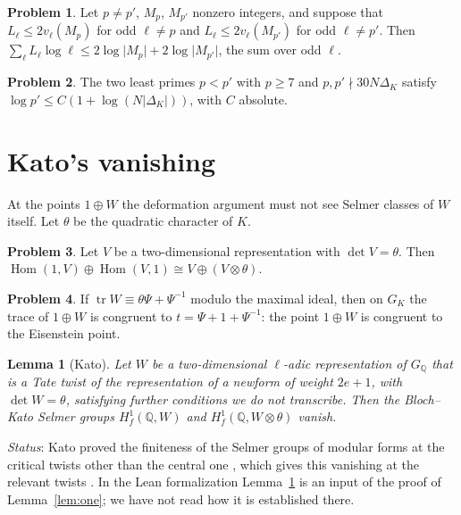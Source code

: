 \documentclass[reqno]{amsart}
\theoremstyle{definition}
\newtheorem{problem}{Problem}[section]
\theoremstyle{plain}
\newtheorem{lemma}[theorem]{Lemma}
\theoremstyle{remark}
\newcommand{\Q}{\mathbb{Q}}
\newcommand{\Hom}{\operatorname{Hom}}
\newcommand{\tr}{\operatorname{tr}}
\begin{document}
\begin{problem}\label{pr:two-primes}
Let \(p\ne p'\), \(M_p\), \(M_{p'}\) nonzero integers, and suppose that \(L_\ell\le2v_\ell(M_p)\) for odd \(\ell\ne p\) and \(L_\ell\le2v_\ell(M_{p'})\) for odd \(\ell\ne p'\).  Then \(\sum_\ell L_\ell\log\ell\le2\log\lvert M_p\rvert+2\log\lvert M_{p'}\rvert\), the sum over odd \(\ell\).
\end{problem}

\begin{problem}\label{pr:least-primes}
The two least primes \(p<p'\) with \(p\ge7\) and \(p,p'\nmid30N\Delta_K\) satisfy \(\log p'\le C(1+\log(N\lvert\Delta_K\rvert))\), with \(C\) absolute.
\end{problem}

\section{Kato's vanishing}\label{sec:kato}

At the points \(1\oplus W\) the deformation argument must not see Selmer classes of \(W\) itself.  Let \(\theta\) be the quadratic character of \(K\).

\begin{problem}\label{pr:hom-part}
Let \(V\) be a two-dimensional representation with \(\det V=\theta\).  Then \(\Hom(1,V)\oplus\Hom(V,1)\cong V\oplus(V\otimes\theta)\).
\end{problem}

\begin{problem}\label{pr:residual}
If \(\tr W\equiv\theta\Psi+\Psi^{-1}\) modulo the maximal ideal, then on \(G_K\) the trace of \(1\oplus W\) is congruent to \(t=\Psi+1+\Psi^{-1}\): the point \(1\oplus W\) is congruent to the Eisenstein point.
\end{problem}

\begin{lemma}[Kato]\label{lem:kato}
Let \(W\) be a two-dimensional \(\ell\)-adic representation of \(G_\Q\) that is a Tate twist of the representation of a newform of weight \(2e+1\), with \(\det W=\theta\), satisfying further conditions we do not transcribe.  Then the Bloch--Kato Selmer groups \(H^1_f(\Q,W)\) and \(H^1_f(\Q,W\otimes\theta)\) vanish.
\end{lemma}

\noindent\emph{Status}: Kato proved the finiteness of the Selmer groups of modular forms at the critical twists other than the central one \cite[Thm.~14.2]{Ka}, which gives this vanishing at the relevant twists \cite[\S5.4]{Zh}.  In the Lean formalization Lemma~\ref{lem:kato} is an input of the proof of Lemma~\ref{lem:one}; we have not read how it is established there.
\end{document}
